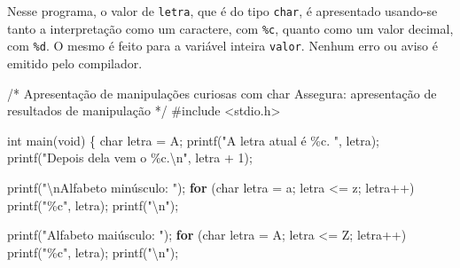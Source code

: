 \documentclass[
  letterpaper,
  DIV=11,
  numbers=noendperiod]{scrartcl}
\newenvironment{Shaded}{\begin{snugshade}}{\end{snugshade}}
\newcommand{\CharTok}[1]{\textcolor[rgb]{0.13,0.47,0.30}{#1}}
\newcommand{\CommentTok}[1]{\textcolor[rgb]{0.37,0.37,0.37}{#1}}
\newcommand{\ControlFlowTok}[1]{\textcolor[rgb]{0.00,0.23,0.31}{\textbf{#1}}}
\newcommand{\DataTypeTok}[1]{\textcolor[rgb]{0.68,0.00,0.00}{#1}}
\newcommand{\DecValTok}[1]{\textcolor[rgb]{0.68,0.00,0.00}{#1}}
\newcommand{\ImportTok}[1]{\textcolor[rgb]{0.00,0.46,0.62}{#1}}
\newcommand{\NormalTok}[1]{\textcolor[rgb]{0.00,0.23,0.31}{#1}}
\newcommand{\OperatorTok}[1]{\textcolor[rgb]{0.37,0.37,0.37}{#1}}
\newcommand{\PreprocessorTok}[1]{\textcolor[rgb]{0.68,0.00,0.00}{#1}}
\newcommand{\SpecialCharTok}[1]{\textcolor[rgb]{0.37,0.37,0.37}{#1}}
\newcommand{\StringTok}[1]{\textcolor[rgb]{0.13,0.47,0.30}{#1}}
\begin{document}
Nesse programa, o valor de \texttt{letra}, que é do tipo \texttt{char},
é apresentado usando-se tanto a interpretação como um caractere, com
\texttt{\%c}, quanto como um valor decimal, com \texttt{\%d}. O mesmo é
feito para a variável inteira \texttt{valor}. Nenhum erro ou aviso é
emitido pelo compilador.

\begin{Shaded}
\begin{Highlighting}[]
\CommentTok{/*}
\CommentTok{Apresentação de manipulações curiosas com char}
\CommentTok{Assegura: apresentação de resultados de manipulação}
\CommentTok{*/}
\PreprocessorTok{\#include }\ImportTok{\textless{}stdio.h\textgreater{}}

\DataTypeTok{int}\NormalTok{ main}\OperatorTok{(}\DataTypeTok{void}\OperatorTok{)} \OperatorTok{\{}
    \DataTypeTok{char}\NormalTok{ letra }\OperatorTok{=} \CharTok{\textquotesingle{}A\textquotesingle{}}\OperatorTok{;}
\NormalTok{    printf}\OperatorTok{(}\StringTok{"A letra atual é }\SpecialCharTok{\%c}\StringTok{. "}\OperatorTok{,}\NormalTok{ letra}\OperatorTok{);}
\NormalTok{    printf}\OperatorTok{(}\StringTok{"Depois dela vem o }\SpecialCharTok{\%c}\StringTok{.}\SpecialCharTok{\textbackslash{}n}\StringTok{"}\OperatorTok{,}\NormalTok{ letra }\OperatorTok{+} \DecValTok{1}\OperatorTok{);}

\NormalTok{    printf}\OperatorTok{(}\StringTok{"}\SpecialCharTok{\textbackslash{}n}\StringTok{Alfabeto minúsculo: "}\OperatorTok{);}
    \ControlFlowTok{for} \OperatorTok{(}\DataTypeTok{char}\NormalTok{ letra }\OperatorTok{=} \CharTok{\textquotesingle{}a\textquotesingle{}}\OperatorTok{;}\NormalTok{ letra }\OperatorTok{\textless{}=} \CharTok{\textquotesingle{}z\textquotesingle{}}\OperatorTok{;}\NormalTok{ letra}\OperatorTok{++)}
\NormalTok{        printf}\OperatorTok{(}\StringTok{"}\SpecialCharTok{\%c}\StringTok{"}\OperatorTok{,}\NormalTok{ letra}\OperatorTok{);}
\NormalTok{    printf}\OperatorTok{(}\StringTok{"}\SpecialCharTok{\textbackslash{}n}\StringTok{"}\OperatorTok{);}

\NormalTok{    printf}\OperatorTok{(}\StringTok{"Alfabeto maiúsculo: "}\OperatorTok{);}
    \ControlFlowTok{for} \OperatorTok{(}\DataTypeTok{char}\NormalTok{ letra }\OperatorTok{=} \CharTok{\textquotesingle{}A\textquotesingle{}}\OperatorTok{;}\NormalTok{ letra }\OperatorTok{\textless{}=} \CharTok{\textquotesingle{}Z\textquotesingle{}}\OperatorTok{;}\NormalTok{ letra}\OperatorTok{++)}
\NormalTok{        printf}\OperatorTok{(}\StringTok{"}\SpecialCharTok{\%c}\StringTok{"}\OperatorTok{,}\NormalTok{ letra}\OperatorTok{);}
\NormalTok{    printf}\OperatorTok{(}\StringTok{"}\SpecialCharTok{\textbackslash{}n}\StringTok{"}\OperatorTok{);}


\end{Highlighting}
\end{Shaded}
\end{document}
